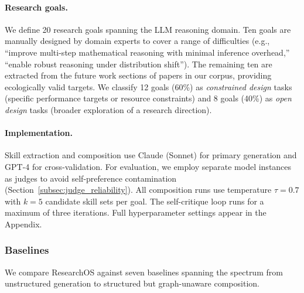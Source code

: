 \paragraph{Research goals.}
We define 20 research goals spanning the LLM reasoning domain. Ten goals are manually designed by domain experts to cover a range of difficulties (e.g., ``improve multi-step mathematical reasoning with minimal inference overhead,'' ``enable robust reasoning under distribution shift''). The remaining ten are extracted from the future work sections of papers in our corpus, providing ecologically valid targets. We classify 12 goals (60\%) as \emph{constrained design} tasks (specific performance targets or resource constraints) and 8 goals (40\%) as \emph{open design} tasks (broader exploration of a research direction).

\paragraph{Implementation.}
Skill extraction and composition use Claude (Sonnet) for primary generation and GPT-4 for cross-validation. For evaluation, we employ separate model instances as judges to avoid self-preference contamination (Section~\ref{subsec:judge_reliability}). All composition runs use temperature $\tau = 0.7$ with $k = 5$ candidate skill sets per goal. The self-critique loop runs for a maximum of three iterations. Full hyperparameter settings appear in the Appendix.

\subsubsection{Baselines}
\label{subsubsec:baselines}

We compare ResearchOS against seven baselines spanning the spectrum from unstructured generation to structured but graph-unaware composition.

